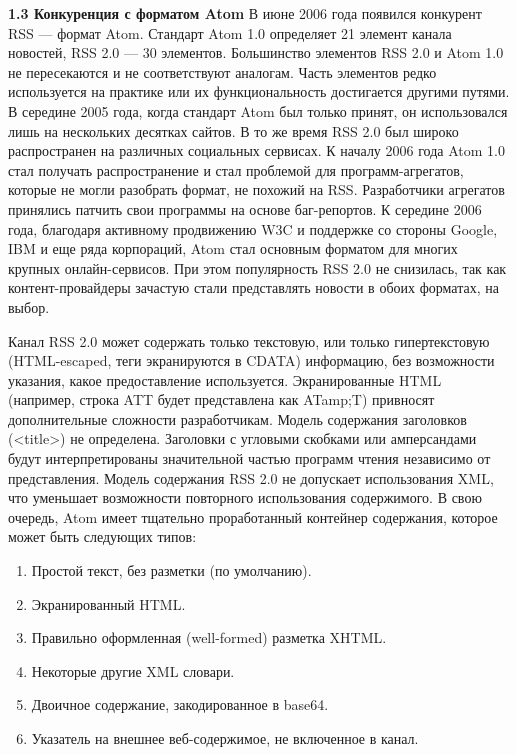 \documentclass[14pt,a4paper]{extreport}
\begin{document}
           \textbf{  1.3 Конкуренция с форматом Atom}
\flushleft\parindent=1cm В июне 2006 года появился конкурент RSS — формат Atom. Стандарт Atom 1.0 определяет 21 элемент канала новостей, RSS 2.0 — 30 элементов. Большинство элементов RSS 2.0 и Atom 1.0 не пересекаются и не соответствуют аналогам. Часть элементов редко используется на практике или их функциональность достигается другими путями. В середине 2005 года, когда стандарт Atom был только принят, он использовался лишь на нескольких десятках сайтов. В то же время RSS 2.0 был широко распространен на различных социальных сервисах. К началу 2006 года Atom 1.0 стал получать распространение и стал проблемой для программ-агрегатов, которые не могли разобрать формат, не похожий на RSS. Разработчики агрегатов принялись патчить свои программы на основе баг-репортов. К середине 2006 года, благодаря активному продвижению W3C и поддержке со стороны Google, IBM и еще ряда корпораций, Atom стал основным форматом для многих крупных онлайн-сервисов. При этом популярность RSS 2.0 не снизилась, так как контент-провайдеры зачастую стали представлять новости в обоих форматах, на выбор.\par
Канал RSS 2.0 может содержать только текстовую, или только гипертекстовую (HTML-escaped, теги экранируются в CDATA) информацию, без возможности указания, какое предоставление используется. Экранированные HTML (например, строка ATT будет представлена как ATamp;T) привносят дополнительные сложности разработчикам. Модель содержания заголовков (<title>) не определена. Заголовки с угловыми скобками или амперсандами будут интерпретированы значительной частью программ чтения независимо от представления. Модель содержания RSS 2.0 не допускает использования XML, что уменьшает возможности повторного использования содержимого.
В свою очередь, Atom имеет тщательно проработанный контейнер содержания, которое может быть следующих типов:
	\begin{enumerate}
		\item Простой текст, без разметки (по умолчанию).	
		\item Экранированный HTML.
		\item Правильно оформленная (well-formed) разметка XHTML.
		\item Некоторые другие XML словари.
		\item Двоичное содержание, закодированное в base64.
		\item Указатель на внешнее веб-содержимое, не включенное в канал.
	\end{enumerate}	
\end{document}
